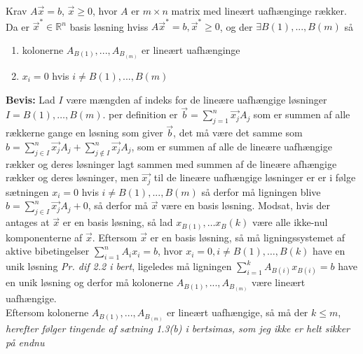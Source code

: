 \begin{stn}
Krav $A\vec{x}=b$, $\vec{x}\geq 0$, hvor $A$ er $m\times n$ matrix med lineært uafhænginge rækker. Da er $\vec{x}^*\in \mathds{R}^n$  basis løsning hviss $A\vec{x}^*=b, \vec{x}^* \geq 0$, og der $\exists B(1), ..., B(m)$ så
\begin{enumerate}[label=(\alph*)]
\item kolonerne $A_{B(1)}, ..., A_{B_(m)}$ er lineært uafhænginge
\item $x_i = 0$ hvis $i \neq B(1),...,B(m)$
\end{enumerate}
\end{stn}
\textbf{Bevis:} 
Lad $I$ være mængden af indeks for de lineære uafhængige løsninger$I={B(1),\dots,B(m)}$. per definition er $\vec{b}=\sum_{j=1}^{n}\vec{x_j}A_j$ som er summen af alle rækkerne gange en løsning som giver $\vec{b}$, det må være det samme som $b=\sum_{j\in I}^{n}\vec{x_j}A_j+\sum_{j\notin I}^{n}\vec{x_j}A_j$, som er summen af alle de lineære uafhængige rækker og deres løsninger lagt sammen med summen af de lineære afhængige rækker og deres løsninger, men $\vec{x_j}$ til de lineære uafhængige løsninger er er i følge sætningen $x_i = 0$ hvis $i \neq B(1),...,B(m)$ så derfor må ligningen blive $b=\sum_{j\in I}^{n}\vec{x_j}A_j+0$, så derfor må $\vec{x}$ være en basis løsning.
Modsat, hvis der antages at $\vec{x}$ er en basis løsning, så lad $x_{B(1)},\dots x_B(k)$ være alle ikke-nul komponenterne af $\vec{x}$. Eftersom $\vec{x}$ er en basis løsning, så må ligningssystemet af aktive bibetingelser $\sum_{i=1}^{n}A_ix_i=b$, hvor $x_i=0, i\neq B(1),\dots , B(k)$ have en unik løsning \textit{Pr. dif 2.2 i bert}, ligeledes må ligningen $\sum_{i=1}^{k}A_{B(i)}x_{B(i)}=b$ have en unik løsning og derfor må kolonerne $A_{B(1)}, ..., A_{B_(m)}$ være lineært uafhængige.\\
Eftersom kolonerne $A_{B(1)}, ..., A_{B_(m)}$ er lineært uafhængige, så må der $k\leq m$, \textit{herefter følger tingende af sætning 1.3(b) i bertsimas, som jeg ikke er helt sikker på endnu}
